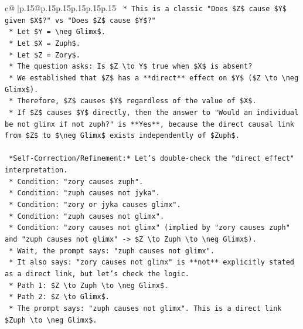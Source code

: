 \documentclass{article}
\begin{document}
{\begin{supertabular}{c@{$\;$}|p{.15\linewidth}@{}p{.15\linewidth}p{.15\linewidth}p{.15\linewidth}p{.15\linewidth}p{.15\linewidth}}
{{{\texttt{    *   This is a classic "Does \$Z\$ cause \$Y\$ given \$X\$?" vs "Does \$Z\$ cause \$Y\$?"} \\
\texttt{    *   Let \$Y = \textbackslash{}neg Glimx\$.} \\
\texttt{    *   Let \$X = Zuph\$.} \\
\texttt{    *   Let \$Z = Zory\$.} \\
\texttt{    *   The question asks: Is \$Z \textbackslash{}to Y\$ true when \$X\$ is absent?} \\
\texttt{    *   We established that \$Z\$ has a **direct** effect on \$Y\$ (\$Z \textbackslash{}to \textbackslash{}neg Glimx\$).} \\
\texttt{    *   Therefore, \$Z\$ causes \$Y\$ regardless of the value of \$X\$.} \\
\texttt{    *   If \$Z\$ causes \$Y\$ directly, then the answer to "Would an individual be not glimx if not zuph?" is **Yes**, because the direct causal link from \$Z\$ to \$\textbackslash{}neg Glimx\$ exists independently of \$Zuph\$.} \\
\\ 
\texttt{    *Self{-}Correction/Refinement:* Let's double{-}check the "direct effect" interpretation.} \\
\texttt{    *   Condition: "zory causes zuph".} \\
\texttt{    *   Condition: "zuph causes not jyka".} \\
\texttt{    *   Condition: "zory or jyka causes glimx".} \\
\texttt{    *   Condition: "zuph causes not glimx".} \\
\texttt{    *   Condition: "zory causes not glimx" (implied by "zory causes zuph" and "zuph causes not glimx" {-}> \$Z \textbackslash{}to Zuph \textbackslash{}to \textbackslash{}neg Glimx\$).} \\
\texttt{    *   Wait, the prompt says: "zuph causes not glimx".} \\
\texttt{    *   It also says: "zory causes not glimx" is **not** explicitly stated as a direct link, but let's check the logic.} \\
\texttt{    *   Path 1: \$Z \textbackslash{}to Zuph \textbackslash{}to \textbackslash{}neg Glimx\$.} \\
\texttt{    *   Path 2: \$Z \textbackslash{}to Glimx\$.} \\
\texttt{    *   The prompt says: "zuph causes not glimx". This is a direct link \$Zuph \textbackslash{}to \textbackslash{}neg Glimx\$.} \\
}}}
\end{supertabular}}
\end{document}
